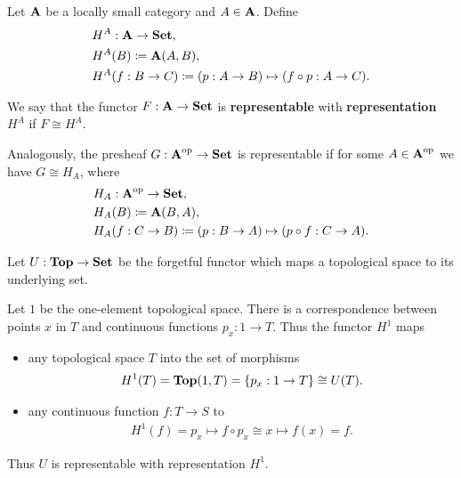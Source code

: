 \begin{definition}\label{def:representable_functor}\cite[definitions 4.1.3, 4.1.16]{Leinster2014}
  Let \( \operatorname{\mathbf{A}} \) be a locally small category and \( A \in \operatorname{\mathbf{A}} \). Define
  \begin{align*}
    &H^A: \operatorname{\mathbf{A}} \to \operatorname{\mathbf{Set}}, \\
    &H^A(B) \coloneqq \operatorname{\mathbf{A}}(A, B), \\
    &H^A(f: B \to C) \coloneqq (p: A \to B) \mapsto (f \circ p: A \to C).
  \end{align*}

  We say that the functor \( F: \operatorname{\mathbf{A}} \to \operatorname{\mathbf{Set}} \) is \textbf{representable} with \textbf{representation} \( H^A \) if \( F \cong H^A \).

  Analogously, the presheaf \( G: \operatorname{\mathbf{A}}^{\operatorname{op}} \to \operatorname{\mathbf{Set}} \) is representable if for some \( A \in \operatorname{\mathbf{A}}^{\operatorname{op}} \) we have \( G \cong H_A \), where
  \begin{align*}
    &H_A: \operatorname{\mathbf{A}}^{\operatorname{op}} \to \operatorname{\mathbf{Set}}, \\
    &H_A(B) \coloneqq \operatorname{\mathbf{A}}(B, A), \\
    &H_A(f: C \to B) \coloneqq (p: B \to A) \mapsto (p \circ f: C \to A).
  \end{align*}
\end{definition}

\begin{example}\label{def:top_representable_functor}\cite[example 4.1.4]{Leinster2014}
  Let \( U: \operatorname{\mathbf{Top}} \to \operatorname{\mathbf{Set}} \) be the forgetful functor which maps a topological space to its underlying set.

  Let \( 1 \) be the one-element topological space. There is a correspondence between points \( x \) in \( T \) and continuous functions \( p_x: 1 \to T \). Thus the functor \( H^1 \) maps
  \begin{itemize}
    \item any topological space \( T \) into the set of morphisms
    \begin{align*}
      H^1(T) = \operatorname{\mathbf{Top}}(1, T) = \{ p_x: 1 \to T \} \cong U(T).
    \end{align*}
    \item any continuous function \( f: T \to S \) to
    \begin{align*}
      H^1(f) = p_x \mapsto f \circ p_x \cong x \mapsto f(x) = f.
    \end{align*}
  \end{itemize}

  Thus \( U \) is representable with representation \( H^1 \).
\end{example}

